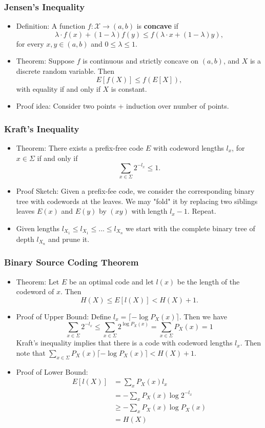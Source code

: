 \documentclass[a4paper]{scrartcl}
\begin{document}
\subsubsection*{Jensen's Inequality}

\begin{itemize}
\item Definition: A function $f: \mathcal{X} \rightarrow (a,b)$ is \textbf{concave} if $$\lambda \cdot f(x) + (1-\lambda)f(y) \leq f(\lambda \cdot x + (1- \lambda)y),$$ for every $x, y \in (a,b)$ and $0\leq\lambda\leq 1$.
\item Theorem: Suppose $f$ is continuous and strictly concave on $(a,b)$, and $X$ is a discrete random variable. Then $$E[f(X)] \leq f(E[X]),$$ with equality if and only if $X$ is constant.
\item Proof idea: Consider two points + induction over number of points.
\end{itemize}

\subsubsection*{Kraft's Inequality}

\begin{itemize}
\item Theorem: There exists a prefix-free code $E$ with codeword lengths $l_x$, for $x\in \Sigma$ if and only if $$\sum_{x\in\Sigma}2^{-l_x}\leq 1.$$
\item Proof Sketch: Given a prefix-fee code, we consider the corresponding binary tree with codewords at the leaves. We may "fold" it by replacing two siblings leaves $E(x)$ and $E(y)$ by $(xy)$ with length $l_x-1$. Repeat.
\item Given lengths $l_{X_1} \leq l_{X_1} \leq ... \leq l_{X_n}$ we start with the complete binary tree of depth $l_{X_n}$ and prune it.
\end{itemize}

\subsubsection*{Binary Source Coding Theorem}
\begin{itemize}
\item Theorem: Let $E$ be an optimal code and let $l(x)$ be the length of the codeword of $x$. Then $$H(X)\leq E[l(X)] < H(X) + 1.$$
\item Proof of Upper Bound: Define $l_x = \lceil-\log P_X(x)\rceil$. Then we have
$$\sum_{x\in\Sigma}2^{-l_x} \leq \sum_{x\in\Sigma}2^{\log P_X(x)}=\sum_{x\in\Sigma}P_X(x) = 1$$
Kraft's inequality implies that there is a code with codeword lengths $l_x$. Then note that
$\sum_{x\in\Sigma}P_X(x)\lceil-\log P_X(x)\rceil < H(X) + 1$.
\item Proof of Lower Bound:
\begin{align*}
E[l(X)] &= \sum_x P_X(x)l_x\\
&=-\sum_x P_X(x)\log 2^{-l_x}\\
&\geq -\sum_x P_X(x)\log P_X(x)\\
&= H(X)
\end{align*}
\end{itemize}
\end{document}
